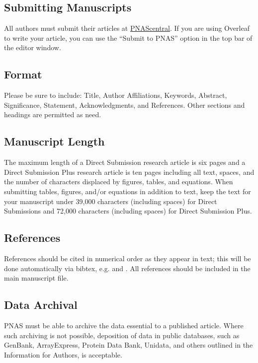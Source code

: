 \documentclass[9pt,twoside]{pnas-new}
\begin{document}
\subsection*{Submitting Manuscripts}

All authors must submit their articles at \href{http://www.pnascentral.org/cgi-bin/main.plex}{PNAScentral}. If you are using Overleaf to write your article, you can use the ``Submit to PNAS'' option in the top bar of the editor window. 

\subsection*{Format}

Please be sure to include: Title, Author Affiliations, Keywords, Abstract, Significance, Statement, Acknowledgments, and References. Other sections and headings are permitted as need.

\subsection*{Manuscript Length}

The maximum length of a Direct Submission research article is six pages and a Direct Submission Plus research article is ten pages including all text, spaces, and the number of characters displaced by figures, tables, and equations.  When submitting tables, figures, and/or equations in addition to text, keep the text for your manuscript under 39,000 characters (including spaces) for Direct Submissions and 72,000 characters (including spaces) for Direct Submission Plus.

\subsection*{References}

References should be cited in numerical order as they appear in text; this will be done automatically via bibtex, e.g. \cite{belkin2002using} and \cite{berard1994embedding,coifman2005geometric}. All references should be included in the main manuscript file. 

\subsection*{Data Archival}

PNAS must be able to archive the data essential to a published article. Where such archiving is not possible, deposition of data in public databases, such as GenBank, ArrayExpress, Protein Data Bank, Unidata, and others outlined in the Information for Authors, is acceptable.
\end{document}
